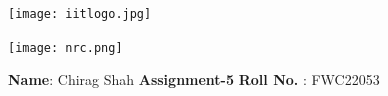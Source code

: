 \documentclass[10pt,a4paper]{report}
\begin{document}
\begin{figure*}[!tbp]
  \centering
  \begin{minipage}[b]{0.4\textwidth}
    \texttt{[image: iitlogo.jpg]}
  \end{minipage}
  \hfill
  \vspace{5mm}\begin{minipage}[b]{0.4\textwidth}
\raggedleft  \texttt{[image: nrc.png]}\

  \end{minipage}\vspace{0.2cm}
\end{figure*}
\raggedright \textbf{Name}:\hspace{1mm} Chirag Shah\hspace{3cm} \Large \textbf{Assignment-5}\hspace{2.5cm} %
\normalsize \textbf{Roll No.} :\hspace{1mm} FWC22053\vspace{1cm}
\end{document}
